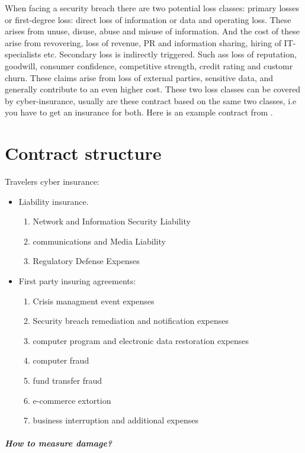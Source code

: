 When facing a security breach there are two potential loss classes:
primary losses or first-degree loss: direct loss of information or data and operating loss. 
These arises from unuse, disuse, abuse and misuse of information.
 And the cost of these arise from revovering, loss of revenue, 
 PR and information sharing, hiring of IT-specialists etc. 
Secondary loss is indirectly triggered. Such ass loss of reputation, goodwill, 
consumer confidence, competitive strength, credit rating and customr churn. 
These claims arise from loss of external parties, sensitive data, 
and generally contribute to an even higher cost. \cite{bandyopadhyay2009managers} 
These two loss classes can be covered by cyber-insurance, 
usually are these contract based on the same two classes, i.e you have to get an insurance for both. 
Here is an example contract from \cite{travelers}.
\section{Contract structure}
Travelers cyber insurance:
\begin{itemize}
\item Liability insurance. \begin{enumerate}
\item Network and Information Security Liability
\item communications and Media Liability
\item Regulatory Defense Expenses
\end{enumerate}
\item First party insuring agreements: \begin{enumerate}
\item Crisis managment event expenses
\item Security breach remediation and notification expenses
\item computer program and electronic data restoration expenses
\item computer fraud
\item fund transfer fraud
\item e-commerce extortion
\item business interruption and additional expenses
\end{enumerate}
\end{itemize}
\subparagraph{How to measure damage?}

